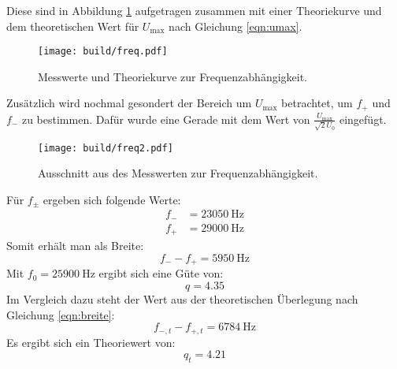 \noindent
Diese sind in Abbildung \ref{fig:freq} aufgetragen zusammen mit einer Theoriekurve und dem theoretischen
Wert für $U_\text{max}$ nach Gleichung \eqref{eqn:umax}.
\begin{figure}
    \centering
    \caption{Messwerte und Theoriekurve zur Frequenzabhängigkeit.}
    \label{fig:freq}
    \texttt{[image: build/freq.pdf]}
\end{figure}
\noindent
Zusätzlich wird nochmal gesondert der Bereich um $U_\text{max}$ betrachtet, um $f_+$ und $f_-$
zu bestimmen. Dafür wurde eine Gerade mit dem Wert von $\frac{U_\text{max}}{\sqrt{2}U_0}$ eingefügt.
\begin{figure}[H]
    \centering
    \caption{Ausschnitt aus des Messwerten zur Frequenzabhängigkeit.}
    \label{fig:freq2}
    \texttt{[image: build/freq2.pdf]}
\end{figure}
\noindent
Für $f_\pm$ ergeben sich folgende Werte:
\begin{align}
    f_- &= \SI{23050}{\hertz}    \\
    f_+ &= \SI{29000}{\hertz}
\end{align}
Somit erhält man als Breite:
\begin{equation}
    f_--f_+ = \SI{5950}{\hertz}
\end{equation}
Mit $f_0 = \SI{25900}{\hertz}$ ergibt sich eine Güte von:
\begin{equation}
    q = 4.35
\end{equation}
Im Vergleich dazu steht der Wert aus der theoretischen Überlegung nach Gleichung \eqref{eqn:breite}:
\begin{equation}
    f_{-,t}-f_{+,t} = \SI{6784}{\hertz}
\end{equation}
Es ergibt sich ein Theoriewert von:
\begin{equation}
    q_t = 4.21
\end{equation}
%
